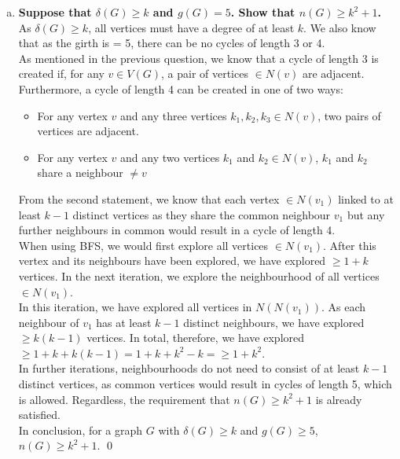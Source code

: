 \begin{enumerate}[a)]
    \boldmath
    \item \textbf{Suppose that $\delta(G) \geq k$ and $g(G) = 5$. Show that $n(G) \geq k^2 + 1$.} \\
    \linebreak 
    \unboldmath
    As $\delta(G) \geq k$, all vertices must have a degree of at least $k$. We also know that as the girth is = 5, there can be no cycles of length 3 or 4. \\
    \linebreak 
    As mentioned in the previous question, we know that a cycle of length 3 is created if, for any $v \in V(G)$, a pair of vertices $\in N(v)$ are adjacent. Furthermore, a cycle of length 4 can be created in one of two ways:
    \begin{itemize}
        \item For any vertex $v$ and any three vertices $k_1, k_2, k_3 \in N(v)$, two pairs of vertices are adjacent. 
        \item For any vertex $v$ and any two vertices $k_1$ and $k_2 \in N(v)$, $k_1$ and $k_2$ share a neighbour \textbf{\boldmath $\neq v$ \unboldmath} 
    \end{itemize}
    From the second statement, we know that each vertex $\in N(v_1)$ linked to at least $k-1$ distinct vertices as they share the common neighbour $v_1$ but any further neighbours in common would result in a cycle of length 4. \\
    \linebreak
    When using BFS, we would first explore all vertices $\in N(v_1)$. After this vertex and its neighbours have been explored, we have explored $ \geq 1 + k$ vertices. In the next iteration, we explore the neighbourhood of all vertices $\in N(v_1)$. \\
    \linebreak 
    In this iteration, we have explored all vertices in $N(N(v_1))$. As each neighbour of $v_1$ has at least $k-1$ distinct neighbours, we have explored $\geq k(k-1)$ vertices. In total, therefore, we have explored $ \geq 1 + k + k(k-1) = 1 + k + k^2 - k = \geq 1 + k^2$. \\
    \linebreak 
    In further iterations, neighbourhoods do not need to consist of at least $k-1$ distinct vertices, as common vertices would result in cycles of length 5, which is allowed. Regardless, the requirement that $n(G) \geq k^2 + 1$ is already satisfied. \\
    \linebreak 
    In conclusion, for a graph $G$ with $\delta(G) \geq k$ and $g(G) \geq 5$, $n(G) \geq k^2 + 1$. \qed
\end{enumerate}
